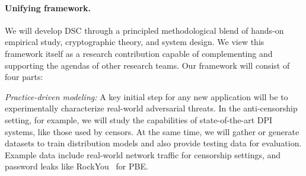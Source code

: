 {{%

\newpage

\paragraph{Unifying framework.}
We will develop DSC through a principled methodological 
blend of hands-on empirical study, cryptographic theory, and
system design. We view this framework itself as a research contribution capable
of complementing and supporting the agendas of other research teams.  
Our framework will consist of four parts:
\begin{newenum}

\item{\em Practice-driven modeling:} A key initial step for any new application will be to 
experimentally characterize real-world adversarial threats. In the
anti-censorship setting, for example,  we will study the capabilities of state-of-the-art DPI
systems, like those used by censors.
At the same time, we will gather or generate datasets to train 
distribution models and also provide testing data for evaluation. 
Example data include real-world network traffic for censorship settings, 
and password leaks like RockYou~\cite{RockYou:2009} for PBE. 


\end{newenum}}}
